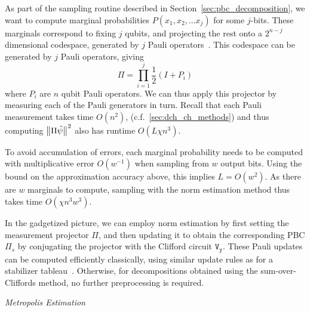 As part of the sampling routine described in Section~\ref{sec:pbc_decomposition}, we want to compute marginal probabilities $P\left(x_{1},x_{2},\dots x_{j}\right)$ for some $j$-bits. These marginals correspond to fixing $j$ qubits, and projecting the rest onto a $2^{n-j}$ dimensional codespace, generated by $j$ Pauli operators~\cite{Bravyi2016}. This codespace can be generated by $j$ Pauli operators, giving
\[\Pi = \prod_{i=1}^{j}\frac{1}{2}\left(I+P_{i}\right)\]
where $P_{i}$ are $n$ qubit Pauli operators. We can thus apply this projector by measuring each of the Pauli generators in turn. Recall that each Pauli measurement takes time $O(n^{2})$, (c.f.~\ref{sec:dch_ch_methods}) and thus computing $\norm{\Pi\tilde{\psi}}^{2}$ also has runtime $O\left(L\chi n^{3}\right)$.\par
To avoid accumulation of errors, each marginal probability needs to be computed with multiplicative error $O(w^{-1})$ when sampling from $w$ output bits. Using the bound on the approximation accuracy above, this implies $L=O(w^{2})$. As there are $w$ marginals to compute, sampling with the norm estimation method thus takes time $O(\chi n^{3}w^{3})$.\par
In the gadgetized picture, we can employ norm estimation by first setting the measurement projector $\Pi$, and then updating it to obtain the corresponding PBC $\Pi_{s}$ by conjugating the projector with the Clifford circuit $\mathtt{V_{y}}$. These Pauli updates can be computed efficiently classically, using similar update rules as for a stabilizer tableau~\cite{Aaronson2004}. Otherwise, for decompositions obtained using the sum-over-Cliffords method, no further preprocessing is required.\par
\large{\itshape{Metropolis Estimation}}\par
